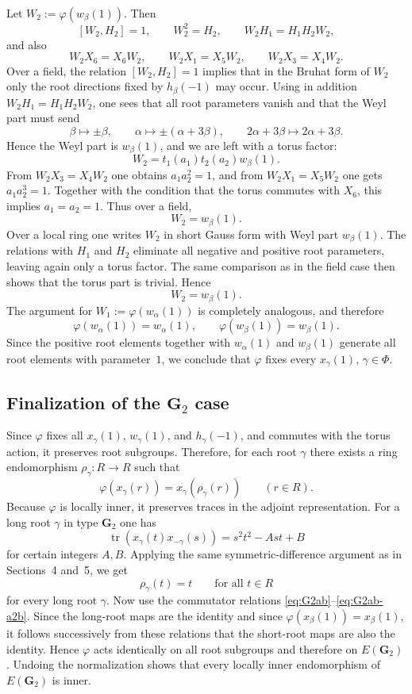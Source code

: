 \documentclass[]{jgcc}
\DeclareMathOperator{\tr}{tr}
\numberwithin{equation}{section}
\begin{document}
Let $W_2:=\varphi(w_\beta(1))$.
Then
\[
[W_2,H_2]=1,\qquad W_2^2=H_2,\qquad W_2H_1=H_1H_2W_2,
\]
and also
\[
W_2X_6=X_6W_2,\qquad W_2X_1=X_5W_2,\qquad W_2X_3=X_4W_2.
\]
Over a field, the relation $[W_2,H_2]=1$ implies that in the Bruhat form of $W_2$ only the root directions fixed by $h_\beta(-1)$ may occur.
Using in addition $W_2H_1=H_1H_2W_2$, one sees that all root parameters vanish and that the Weyl part must send
\[
\beta\mapsto\pm\beta,\qquad \alpha\mapsto\pm(\alpha+3\beta),\qquad 2\alpha+3\beta\mapsto 2\alpha+3\beta.
\]
Hence the Weyl part is $w_\beta(1)$, and we are left with a torus factor:
\[
W_2=t_1(a_1)t_2(a_2)w_\beta(1).
\]
From $W_2X_3=X_4W_2$ one obtains $a_1a_2^2=1$, and from $W_2X_1=X_5W_2$ one gets $a_1a_2^3=1$.
Together with the condition that the torus commutes with $X_6$, this implies $a_1=a_2=1$.
Thus over a field,
\[
W_2=w_\beta(1).
\]
Over a local ring one writes $W_2$ in short Gauss form with Weyl part $w_\beta(1)$.
The relations with $H_1$ and $H_2$ eliminate all negative and positive root parameters, leaving again only a torus factor.
The same comparison as in the field case then shows that the torus part is trivial.
Hence
\[
W_2=w_\beta(1).
\]
The argument for $W_1:=\varphi(w_\alpha(1))$ is completely analogous, and therefore
\[
\varphi(w_\alpha(1))=w_\alpha(1),\qquad \varphi(w_\beta(1))=w_\beta(1).
\]
Since the positive root elements together with $w_\alpha(1)$ and $w_\beta(1)$ generate all root elements with parameter~$1$,
we conclude that $\varphi$ fixes every $x_\gamma(1)$, $\gamma\in\Phi$.

\subsection{\texorpdfstring{Finalization of the $\mathbf G_2$ case}{Finalization of the G2 case}}

Since $\varphi$ fixes all $x_\gamma(1)$, $w_\gamma(1)$, and $h_\gamma(-1)$, and commutes with the torus action,
it preserves root subgroups.
Therefore, for each root $\gamma$ there exists a ring endomorphism $\rho_\gamma\colon R\to R$ such that
\[
\varphi(x_\gamma(r))=x_\gamma(\rho_\gamma(r))
\qquad (r\in R).
\]
Because $\varphi$ is locally inner, it preserves traces in the adjoint representation.
For a long root $\gamma$ in type $\mathbf G_2$ one has
\[
\tr(x_\gamma(t)x_{-\gamma}(s))=s^2t^2-Ast+B
\]
for certain integers $A,B$.
Applying the same symmetric-difference argument as in Sections~4 and~5, we get
\[
\rho_\gamma(t)=t\qquad\text{for all }t\in R
\]
for every long root $\gamma$.
Now use the commutator relations \eqref{eq:G2ab}--\eqref{eq:G2ab-a2b}.
Since the long-root maps are the identity and since $\varphi(x_\beta(1))=x_\beta(1)$, it follows successively from these relations that the short-root maps are also the identity.
Hence $\varphi$ acts identically on all root subgroups and therefore on $E(\mathbf G_2)$.
Undoing the normalization shows that every locally inner endomorphism of $E(\mathbf G_2)$ is inner.
\end{document}
